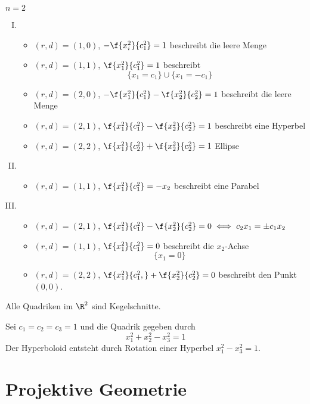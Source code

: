 \documentclass[a4paper, 10pt]{scrbook}
\begin{document}
\begin{ex}[Quadriken in $E=\R^2$]
	$n=2$
	\begin{enumerate}[(I)]
		\item
			\begin{itemize}
				\item $(r,d)=(1,0)$, $-\f{x_i^2}{c_1^2}=1$ beschreibt die leere Menge

				\item $(r,d)=(1,1)$, $\f{x_1^2}{c_1^2}=1$ beschreibt
					\[
						\{x_1=c_1\} \cup \{x_1=-c_1\}
					\]
				\item $(r,d)=(2,0)$, $-\f{x_1^2}{c_1^2}-\f{x_2^2}{c_2^2}=1$ beschreibt die leere Menge

				\item $(r,d)=(2,1)$, $\f{x_1^2}{c_1^2}-\f{x_2^2}{c_2^2}=1$ beschreibt eine Hyperbel
				\item $(r,d)=(2,2)$, $\f{x_1^2}{c_2^2} + \f{x_2^2}{c_2^2}=1$ Ellipse
			\end{itemize}
		\item
			\begin{itemize}
				\item $(r,d)=(1,1)$, $\f{x_1^2}{c_1^2} = -x_2$ beschreibt eine Parabel
			\end{itemize}
		\item
			\begin{itemize}
				\item $(r,d)=(2,1)$, $\f{x_1^2}{c_1^2}-\f{x_2^2}{c_2^2} = 0 \iff c_2x_1 = \pm c_1x_2$
				\item $(r,d)=(1,1)$, $\f{x_1^2}{c_1^2} = 0$ beschreibt die $x_2$-Achse
					\[
						\{x_1 = 0\}
					\]
				\item $(r,d)=(2,2)$, $\f{x_1^2}{c_1^2,}+ \f{x_2^2}{c_2^2}=0$ beschreibt den Punkt $(0,0)$.
			\end{itemize}
	\end{enumerate}
	\begin{note}
		Alle Quadriken im $\R^2$ sind Kegelschnitte.
	\end{note}
\end{ex}

\begin{ex}[Hyperboloid]
	Sei $c_1=c_2=c_3=1$ und die Quadrik gegeben durch
	\[
		x_1^2 + x_2^2 - x_3^2 = 1
	\]
	Der Hyperboloid entsteht durch Rotation einer Hyperbel $x_1^2 - x_3^2 = 1$.
\end{ex}



\chapter{Projektive Geometrie}
\end{document}
